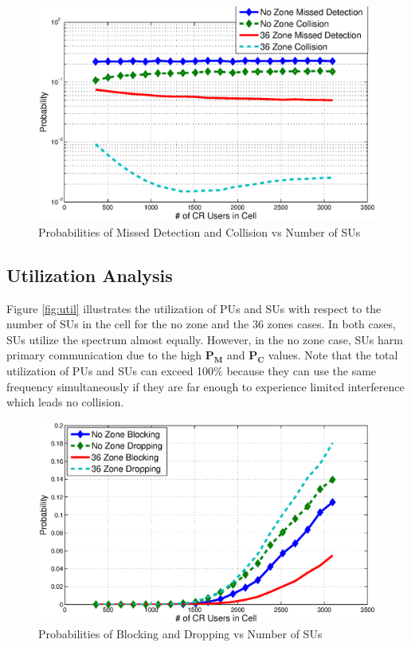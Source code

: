 \documentclass[conference,compsoc]{IEEEtran}
\newcommand{\probm}{\mathbf{P_M}}
\begin{document}
\begin{figure}[t]
\centering
\includegraphics[width=0.99\columnwidth,keepaspectratio] {figs/pm_c.eps}
\caption{Probabilities of Missed Detection and Collision vs Number of
SUs} \label{fig:probm}
\end{figure}


\subsection{Utilization Analysis}
Figure \ref{fig:util} illustrates the utilization of PUs and SUs with respect to the number of SUs in the cell for the no zone and the 36 zones cases. In both cases, SUs utilize the spectrum almost equally. However, in the no zone case, SUs harm primary communication due to the high $\probm$ and $\mathbf{P_C}$ values. Note that the total utilization of PUs and SUs can exceed 100\% because they can use the same frequency simultaneously if they are far enough to experience limited interference which leads no collision. 

\begin{figure}[t]
\centering
\includegraphics[width=0.99\columnwidth,keepaspectratio] {figs/pb_d.eps}
\caption{Probabilities of Blocking and Dropping vs Number of SUs}
\label{fig:probb}
\end{figure}
\end{document}
